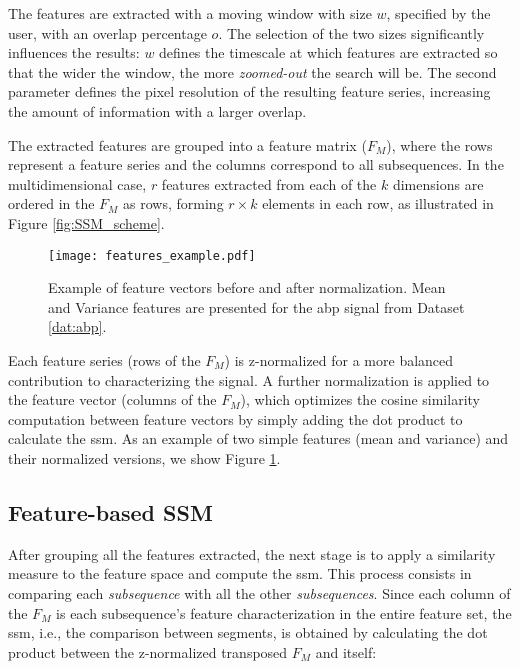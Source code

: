 The features are extracted with a moving window with size $w$, specified by the user, with an overlap percentage $o$. The selection of the two sizes significantly influences the results: $w$ defines the timescale at which features are extracted so that the wider the window, the more \textit{zoomed-out} the search will be. The second parameter defines the pixel resolution of the resulting feature series, increasing the amount of information with a larger overlap.

The extracted features are grouped into a feature matrix ($F_{M}$), where the rows represent a feature series and the columns correspond to all subsequences. In the multidimensional case, $r$ features extracted from each of the $k$ dimensions are ordered in the $F_M$ as rows, forming $r \times k$ elements in each row, as illustrated in Figure \ref{fig:SSM_scheme}.

\begin{figure}
\texttt{[image: features\_example.pdf]}
\caption{Example of feature vectors before and after normalization. Mean and Variance features are presented for the \gls{abp} signal from Dataset \ref{dat:abp}.}
\label{fig:features_normalized}
\end{figure}

Each feature series (rows of the $F_M$) is z-normalized for a more balanced contribution to characterizing the signal. A further normalization is applied to the feature vector (columns of the $F_M$), which optimizes the cosine similarity computation between feature vectors by simply adding the dot product to calculate the \gls{ssm}. As an example of two simple features (mean and variance) and their normalized versions, we show Figure \ref{fig:features_normalized}.

\subsection{Feature-based SSM}
\label{sec:the_ssm}

After grouping all the features extracted, the next stage is to apply a similarity measure to the feature space and compute the \gls{ssm}. This process consists in comparing each \textit{subsequence} with all the other \textit{subsequences}. Since each column of the $F_M$ is each subsequence's feature characterization in the entire feature set, the \gls{ssm}, i.e., the comparison between segments, is obtained by calculating the dot product between the z-normalized transposed $F_{M}$ and itself:

